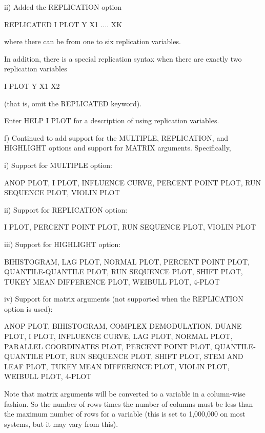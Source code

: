 {       ii) Added the REPLICATION option

              REPLICATED I PLOT Y X1 .... XK

           where there can be from one to six replication variables.

           In addition, there is a special replication syntax when
           there are exactly two replication variables

               I PLOT Y X1 X2

           (that is, omit the REPLICATED keyword).

           Enter HELP I PLOT for a description of using replication
           variables.

    f) Continued to add support for the MULTIPLE, REPLICATION, and
       HIGHLIGHT options and support for MATRIX arguments.  Specifically,

          i) Support for MULTIPLE option:

             ANOP PLOT, I PLOT, INFLUENCE CURVE, PERCENT POINT PLOT,
             RUN SEQUENCE PLOT, VIOLIN PLOT

         ii) Support for REPLICATION option:

             I PLOT, PERCENT POINT PLOT, RUN SEQUENCE PLOT, VIOLIN PLOT

        iii) Support for HIGHLIGHT option:

             BIHISTOGRAM, LAG PLOT, NORMAL PLOT, PERCENT POINT PLOT,
             QUANTILE-QUANTILE PLOT, RUN SEQUENCE PLOT, SHIFT PLOT,
             TUKEY MEAN DIFFERENCE PLOT, WEIBULL PLOT, 4-PLOT

         iv) Support for matrix arguments (not supported when the
             REPLICATION option is used):

             ANOP PLOT, BIHISTOGRAM, COMPLEX DEMODULATION, DUANE PLOT,
             I PLOT, INFLUENCE CURVE, LAG PLOT, NORMAL PLOT, 
             PARALLEL COORDINATES PLOT, PERCENT POINT PLOT,
             QUANTILE-QUANTILE PLOT, RUN SEQUENCE PLOT, SHIFT PLOT,
             STEM AND LEAF PLOT, TUKEY MEAN DIFFERENCE PLOT,
             VIOLIN PLOT, WEIBULL PLOT, 4-PLOT

             Note that matrix arguments will be converted to a variable
             in a column-wise fashion.  So the number of rows times the
             number of columns must be less than the maximum number of
             rows for a variable (this is set to 1,000,000 on most
             systems, but it may vary from this).

}
